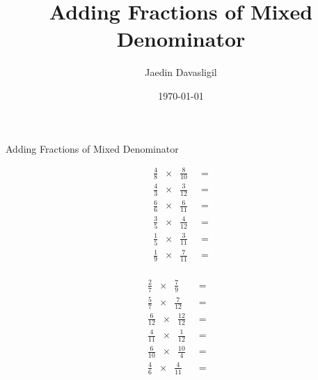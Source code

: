 \documentclass{article}
\title{Adding Fractions of Mixed Denominator}
\author{Jaedin Davasligil}
\date{\today}
\begin{document}
\thispagestyle{empty}
\begin{center}
\huge Adding Fractions of Mixed Denominator
\end{center}
\begin{multicols}{2}
	\vspace*{.5in} \huge
	\begin{align*}
		\frac{4}{8} \;\; \times \;\; \frac{8}{10} \;\; &= \\[.75in]
		\frac{4}{3} \;\; \times \;\; \frac{3}{12} \;\; &= \\[.75in]
		\frac{6}{6} \;\; \times \;\; \frac{6}{11} \;\; &= \\[.75in]
		\frac{3}{5} \;\; \times \;\; \frac{4}{12} \;\; &= \\[.75in]
		\frac{1}{5} \;\; \times \;\; \frac{3}{11} \;\; &= \\[.75in]
		\frac{1}{9} \;\; \times \;\; \frac{7}{11} \;\; &= \\[.75in]
	\end{align*}

	\columnbreak

	\vspace*{.5in}
	\begin{align*}
		\frac{2}{7} \;\; \times \;\; \frac{7}{9} \;\; &= &\\[.75in]
		\frac{5}{7} \;\; \times \;\; \frac{7}{12} \;\; &= &\\[.75in]
		\frac{6}{12} \;\; \times \;\; \frac{12}{12} \;\; &= &\\[.75in]
		\frac{4}{11} \;\; \times \;\; \frac{1}{12} \;\; &= &\\[.75in]
		\frac{6}{10} \;\; \times \;\; \frac{10}{4} \;\; &= &\\[.75in]
		\frac{4}{6} \;\; \times \;\; \frac{4}{11} \;\; &= &\\[.75in]
	\end{align*}
\end{multicols}
\end{document}
